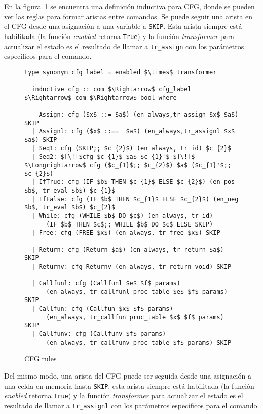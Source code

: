 En la figura~\ref{fig:cfg_rules} se encuentra una definición inductiva para CFG, donde se pueden ver las reglas para formar aristas entre comandos.
Se puede seguir una arista en el CFG desde una asignación a una variable a \verb|SKIP|.
Esta arista siempre está habilitada (la función \textit{enabled} retorna \verb|True|) y la función \textit{transformer} para actualizar el estado es el resultado de llamar a \verb|tr_assign| con los parámetros específicos para el comando.

\begin{figure} 
  \begin{lstlisting}[frame=single, mathescape=true]
  type_synonym cfg_label = enabled $\times$ transformer

  inductive cfg :: com $\Rightarrow$ cfg_label $\Rightarrow$ com $\Rightarrow$ bool where

    Assign: cfg ($x$ ::= $a$) (en_always,tr_assign $x$ $a$) SKIP
  | Assignl: cfg ($x$ ::==  $a$) (en_always,tr_assignl $x$ $a$) SKIP
  | Seq1: cfg (SKIP;; $c_{2}$) (en_always, tr_id) $c_{2}$
  | Seq2: $[\![$cfg $c_{1}$ $a$ $c_{1}'$ $]\!]$ $\Longrightarrow$ cfg ($c_{1}$;; $c_{2}$) $a$ ($c_{1}'$;; $c_{2}$)
  | IfTrue: cfg (IF $b$ THEN $c_{1}$ ELSE $c_{2}$) (en_pos $b$, tr_eval $b$) $c_{1}$
  | IfFalse: cfg (IF $b$ THEN $c_{1}$ ELSE $c_{2}$) (en_neg $b$, tr_eval $b$) $c_{2}$
  | While: cfg (WHILE $b$ DO $c$) (en_always, tr_id)
      (IF $b$ THEN $c$;; WHILE $b$ DO $c$ ELSE SKIP)
  | Free: cfg (FREE $x$) (en_always, tr_free $x$) SKIP

  | Return: cfg (Return $a$) (en_always, tr_return $a$) SKIP
  | Returnv: cfg Returnv (en_always, tr_return_void) SKIP

  | Callfunl: cfg (Callfunl $e$ $f$ params)
      (en_always, tr_callfunl proc_table $e$ $f$ params) SKIP
  | Callfun: cfg (Callfun $x$ $f$ params)
      (en_always, tr_callfun proc_table $x$ $f$ params) SKIP
  | Callfunv: cfg (Callfunv $f$ params)
      (en_always, tr_callfunv proc_table $f$ params) SKIP
  \end{lstlisting}

  \caption{CFG rules}
  \label{fig:cfg_rules}
\end{figure}

Del mismo modo, una arista del CFG puede ser seguida desde una asignación a una celda en memoria hasta \verb|SKIP|, esta arista siempre está habilitada (la función \textit{enabled} retorna \verb|True|) y la función \textit{transformer} para actualizar el estado es el resultado de llamar a \verb|tr_assignl| con los parámetros específicos para el comando.

